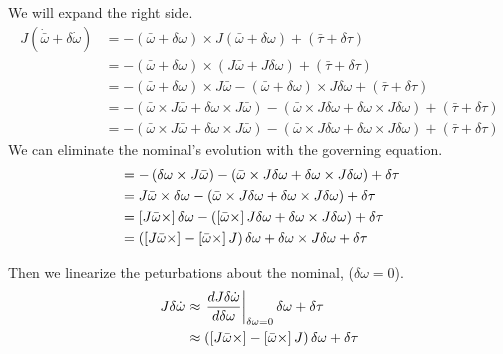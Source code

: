 \documentclass[]{article}
\begin{document}
We will expand the right side.
\begin{align}
	J \left(\dot{\bar{\omega}} + \delta \dot{\omega} \right) & = -\left(\bar{\omega} + \delta \omega \right) \times J \left(\bar{\omega} + \delta \omega \right) + \left(\bar{\tau} + \delta \tau \right) \\
	& = -\left(\bar{\omega} + \delta \omega \right) \times \left(J\bar{\omega} + J \delta \omega \right) + \left(\bar{\tau} + \delta \tau \right) \\
	& = -\left(\bar{\omega} + \delta \omega \right) \times J\bar{\omega} -\left(\bar{\omega} + \delta \omega \right) \times J \delta \omega + \left(\bar{\tau} + \delta \tau \right) \\
	& = -\left(\bar{\omega}  \times J\bar{\omega} + \delta \omega  \times J\bar{\omega} \right) -\left(\bar{\omega} \times J \delta \omega + \delta \omega \times J \delta \omega \right)  + \left(\bar{\tau} + \delta \tau \right) \\
	& = -\left(\bar{\omega}  \times J\bar{\omega} + \delta \omega  \times J\bar{\omega} \right) -\left(\bar{\omega} \times J \delta \omega + \delta \omega \times J \delta \omega \right)  + \left(\bar{\tau} + \delta \tau \right)
\end{align}
We can eliminate the nominal's evolution with the governing equation.
\begin{align}
	 & = -\left( \delta \omega  \times J\bar{\omega} \right) -\left(\bar{\omega} \times J \delta \omega + \delta \omega \times J \delta \omega \right)  + \delta \tau \\
	& = J \bar{\omega} \times \delta \omega -\left(\bar{\omega} \times J \delta \omega + \delta \omega \times J \delta \omega \right)  + \delta \tau \\
	& = \left[ J \bar{\omega} \times \right] \delta \omega -\left(\left[ \bar{\omega} \times \right] J \delta \omega + \delta \omega \times J \delta \omega \right)  + \delta \tau \\
	& = \left( \left[ J \bar{\omega} \times \right] - \left[ \bar{\omega} \times \right] J \right) \delta \omega + \delta \omega \times J \delta \omega  + \delta \tau
\end{align}

Then we linearize the peturbations about the nominal, ($\delta \omega = 0$).
\begin{align}
	J \delta \dot{\omega} & \approx \left. \frac{d J \delta \dot{\omega}}{d \delta \omega} \right|_{\delta \omega = 0} \delta \omega  + \delta \tau \\
	& \approx \left( \left[ J \bar{\omega} \times \right] - \left[ \bar{\omega} \times \right] J \right) \delta \omega + \delta \tau
\end{align}
\end{document}
